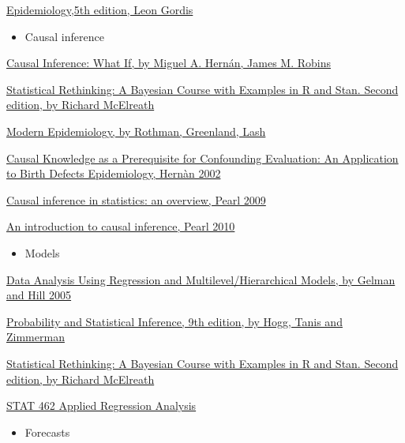 \documentclass[
]{article}
\providecommand{\tightlist}{%
  \setlength{\itemsep}{0pt}\setlength{\parskip}{0pt}}
\begin{document}
\href{https://www.elsevier.com/books/epidemiology/gordis/978-1-4557-3733-8}{Epidemiology,5th
edition, Leon Gordis}

\begin{itemize}
\tightlist
\item
  Causal inference
\end{itemize}

\href{https://www.hsph.harvard.edu/miguel-hernan/causal-inference-book/}{Causal
Inference: What If, by Miguel A. Hernán, James M. Robins}

\href{http://xcelab.net/rm/statistical-rethinking/}{Statistical
Rethinking: A Bayesian Course with Examples in R and Stan. Second
edition, by Richard McElreath}

\href{https://www.rti.org/publication/modern-epidemiology-3rd-edition}{Modern
Epidemiology, by Rothman, Greenland, Lash}

\href{https://academic.oup.com/aje/article/155/2/176/108106}{Causal
Knowledge as a Prerequisite for Confounding Evaluation: An Application
to Birth Defects Epidemiology, Hernàn 2002}

\href{https://projecteuclid.org/euclid.ssu/1255440554http://projecteuclid.org/euclid.ssu/1255440554}{Causal
inference in statistics: an overview, Pearl 2009}

\href{https://www.ncbi.nlm.nih.gov/pmc/articles/PMC2836213/}{An
introduction to causal inference, Pearl 2010}

\begin{itemize}
\tightlist
\item
  Models
\end{itemize}

\href{http://www.stat.columbia.edu/~gelman/arm/}{Data Analysis Using
Regression and Multilevel/Hierarchical Models, by Gelman and Hill 2005}

\href{https://www.pearson.com/us/higher-education/program/Hogg-Probability-and-Statistical-Inference-9th-Edition/PGM91556.html}{Probability
and Statistical Inference, 9th edition, by Hogg, Tanis and Zimmerman}

\href{http://xcelab.net/rm/statistical-rethinking/}{Statistical
Rethinking: A Bayesian Course with Examples in R and Stan. Second
edition, by Richard McElreath}

\href{https://online.stat.psu.edu/stat462/node/95/}{STAT 462 Applied
Regression Analysis}

\begin{itemize}
\tightlist
\item
  Forecasts
\end{itemize}
\end{document}
